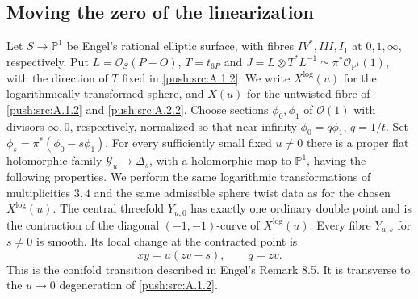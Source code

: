 \subsection{Moving the zero of the linearization}
\begin{theorem}\label{maps:src:D.3.1}


Let $S\to\mathbb P^1$ be Engel's rational elliptic surface, with
fibres $IV^*,III,I_1$ at $0,1,\infty$, respectively. Put
$L=\mathcal O_S(P-O)$, $T=t_{6P}$ and
$J=L\otimes T^*L^{-1}\simeq\pi^*\mathcal O_{\mathbb P^1}(1)$,
with the direction of $T$ fixed in \cref{push:src:A.1.2}. We write $X^{\log}(u)$ for the logarithmically transformed sphere, and $X(u)$ for the untwisted fibre of \cref{push:src:A.1.2} and \cref{push:src:A.2.2}. Choose sections
$\phi_0,\phi_1$ of $\mathcal O(1)$ with divisors $\infty,0$,
respectively, normalized so that near infinity
$\phi_0=q\phi_1$, $q=1/t$. Set
$\phi_s=\pi^*(\phi_0-s\phi_1)$.
For every sufficiently small fixed $u\ne0$ there is a proper flat
holomorphic family $\mathcal Y_u\to\Delta_s$, with a holomorphic
map to $\mathbb P^1$, having the following properties. We perform
the same logarithmic transformations of multiplicities $3,4$ and
the same admissible sphere twist data as for the chosen $X^{\log}(u)$.
The central threefold $Y_{u,0}$ has exactly one ordinary double point
and is the contraction of the diagonal $(-1,-1)$-curve of $X^{\log}(u)$.
Every fibre $Y_{u,s}$ for $s\ne0$ is smooth. Its local change at the
contracted point is
\[
 xy=u(zv-s),\qquad q=zv.
\]
This is the conifold transition described in Engel's Remark 8.5.
It is transverse to the $u\to0$ degeneration of \cref{push:src:A.1.2}.
\end{theorem}


